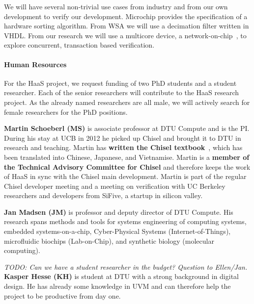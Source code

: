 \documentclass[fleqn,12pt]{article}
\newcommand{\todo}[1]{{\it TODO: #1}}
\begin{document}
We will have several non-trivial use cases from industry and from our own development to verify
our development.
Microchip provides the specification of a hardware sorting algorithm.
From WSA we will use a decimation filter written in VHDL.
From our research we will use a multicore device, a network-on-chip~\cite{s4noc:nocarc2019},
to explore concurrent, transaction based verification.

\paragraph*{Human Resources}

For the HaaS project, we request funding of two PhD students and a student researcher.
Each of the senior researchers will contribute to the HaaS research project.
%
%
As the already named researchers are all male, we will actively search
for female researchers for the PhD positions.


{\bf Martin Schoeberl (MS)} is associate professor at DTU Compute and is the PI.
During his stay
at UCB in 2012 he picked up Chisel and brought it to DTU in research and teaching.
Martin has {\bf written the Chisel textbook}~\cite{chisel:book}, which has been translated
into Chinese, Japanese, and Vietnamise. Martin is a {\bf member of the Technical Advisory Committee for
Chisel} and therefore keeps the work of HaaS in sync with the Chisel main development.
Martin is part of the regular Chisel developer meeting and a meeting on verification with
UC Berkeley researchers and developers from SiFive, a startup in silicon valley.


{\bf Jan Madsen (JM)} is professor and deputy director of DTU Compute.
His research spans methods
and tools for systems engineering of computing systems, embedded systems-on-a-chip,
Cyber-Physical Systems (Internet-of-Things), microfluidic biochips (Lab-on-Chip), and
synthetic biology (molecular computing). 

\todo{Can we have a student researcher in the budget? Question to Ellen/Jan.}
{\bf Kasper Hesse (KH)} is student at DTU with a strong background in digital design.
He has already some knowledge in UVM and can therefore help the project to be productive
from day one.
\end{document}

